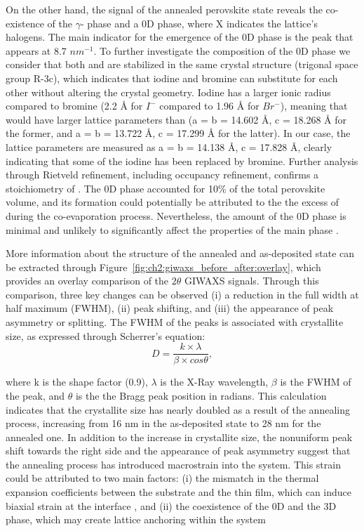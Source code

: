 On the other hand, the signal of the annealed perovskite state reveals the co-existence of the $\gamma$- phase and a 0D  phase, where X indicates the lattice's halogens. The main indicator for the emergence of the 0D phase is the peak that appears at 8.7 $nm^{-1}$. To further investigate the composition of the 0D phase we consider that both  and  are stabilized in the same crystal structure (trigonal space group R-3c), which indicates that iodine and bromine can substitute for each other without altering the crystal geometry. Iodine has a larger ionic radius compared to bromine (2.2 {\AA} for $I^-$ compared to 1.96 {\AA} for $Br^-$), meaning that  would have larger lattice parameters than  (a = b = 14.602 {\AA}, c = 18.268 {\AA} for the former, and a = b = 13.722 {\AA}, c = 17.299 {\AA} for the latter)\cite{Bhaumik2020BroadbandNanocrystals,DeBastiani2017InsideCrystals}. In our case, the lattice parameters are measured as a = b = 14.138 {\AA}, c = 17.828 {\AA}, clearly indicating that some of the iodine has been replaced by bromine.  Further analysis through Rietveld refinement, including occupancy refinement, confirms a stoichiometry of . The 0D phase accounted for 10\% of the total perovskite volume, and its formation could potentially be attributed to the the excess of  during the co-evaporation process. Nevertheless, the amount of the 0D phase is minimal and unlikely to significantly affect the properties of the main phase \cite{Bai2019AStability}. 

More information about the structure of the annealed and as-deposited state can be extracted through Figure~\ref{fig:ch2:giwaxs_before_after:overlay}, which provides an overlay comparison of the $2\theta$ GIWAXS signals. Through this comparison, three key changes can be observed (i) a reduction in the full width at half maximum (FWHM), (ii) peak shifting, and (iii) the appearance of peak asymmetry or splitting. The FWHM of the peaks is associated with crystallite size, as expressed through Scherrer's equation: 
 \begin{equation}
     D = \frac{k \times \lambda}{\beta \times cos\theta},
 \end{equation}

where k is the shape factor (0.9), $\lambda$ is the X-Ray wavelength, $\beta$ is the FWHM of the peak, and $\theta$ is the the Bragg peak position in radians. This calculation indicates that the crystallite size has nearly doubled as a result of the annealing process, increasing from 16 nm in the as-deposited state to 28 nm for the annealed one. In addition to the increase in crystallite size, the nonuniform peak shift towards the right side and the appearance of peak asymmetry suggest that the annealing process has introduced macrostrain into the system. This strain could be attributed to two main factors: (i) the mismatch in the thermal expansion coefficients between the substrate and the thin film, which can induce biaxial strain at the interface \cite{Steele2019ThermalFilms}, and (ii) the coexistence of the 0D  and the 3D  phase, which may create lattice anchoring within the system \cite{Steele2022AnFilms, Saha2024Oxygen-MediatedPerformance}

